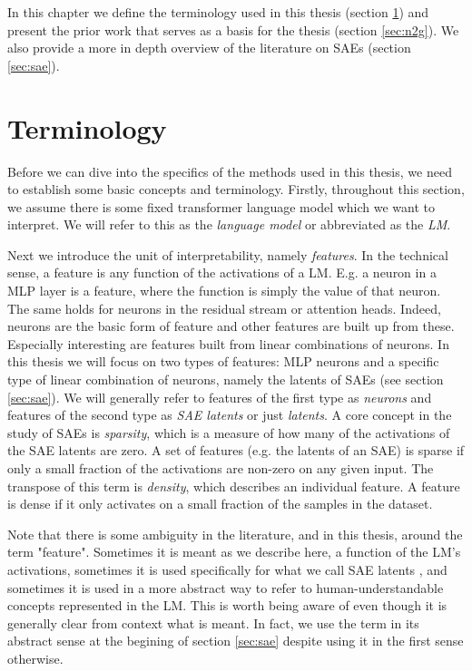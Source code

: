 In this chapter we define the terminology used in this thesis (section \ref{sec:preliminaries}) and present the prior work that serves as a basis for the thesis (section \ref{sec:n2g}).
We also provide a more in depth overview of the literature on \acp{SAE} (section \ref{sec:sae}).

\section{Terminology}
\label{sec:preliminaries}
Before we can dive into the specifics of the methods used in this thesis, 
we need to establish some basic concepts and terminology.
Firstly, throughout this section, we assume there is some fixed 
transformer language model \parencite{vaswani_attention_2023} 
which we want to interpret.
We will refer to this as the \emph{language model} or abbreviated as the \emph{LM}.

Next we introduce the unit of interpretability, namely \emph{features}. 
In the technical sense, a feature is any function of the activations 
of a \ac{LM}.
E.g. a neuron in a \ac{MLP} layer is a feature, where the function is simply the value of that neuron.
The same holds for neurons in the residual stream or attention heads.
Indeed, neurons are the basic form of feature and other features are built up from these.
Especially interesting are features built from linear combinations of neurons.
In this thesis we will focus on two types of features:
\Ac{MLP} neurons and a specific type of linear combination of neurons, namely the latents of \acp{SAE} (see section \ref{sec:sae}).
We will generally refer to features of the first type as \emph{neurons} and features of the second type as \emph{SAE latents} or just \emph{latents}.
A core concept in the study of \acp{SAE} is \emph{sparsity}, which is a measure of how many of the activations of the \ac{SAE} latents are zero.
A set of features (e.g. the latents of an SAE) is sparse if only a small fraction of the activations are non-zero on any given input.
The transpose of this term is \emph{density}, which describes an individual feature.
A feature is dense if it only activates on a small fraction of the samples in the dataset.

Note that there is some ambiguity in the literature, and in this thesis, around the term "feature".
Sometimes it is meant as we describe here, a function of the \ac{LM}'s activations, sometimes it is used specifically for what we call \ac{SAE} latents \parencite{templeton_scaling_2024}, and sometimes it is used in a more abstract way to refer to human-understandable concepts represented in the \ac{LM}.
This is worth being aware of even though it is generally clear from context what is meant.
In fact, we use the term in its abstract sense at the begining of section \ref{sec:sae} despite using it in the first sense otherwise.

